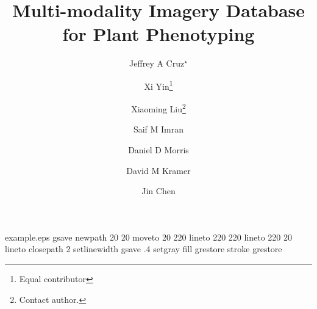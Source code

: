 %
%
%
%
%
\begin{filecontents*}{example.eps}
gsave
newpath
  20 20 moveto
  20 220 lineto
  220 220 lineto
  220 20 lineto
closepath
2 setlinewidth
gsave
  .4 setgray fill
grestore
stroke
grestore
\end{filecontents*}
%
\RequirePackage{fix-cm}
%
\documentclass[smallextended]{svjour3}       %
%
\smartqed  %
%
\usepackage{graphicx}
\usepackage{epstopdf}
\usepackage{color}
\usepackage{multirow}
\usepackage{tabularx}
%
%
%
%
%



\title{Multi-modality Imagery Database for Plant Phenotyping %
}


\author{Jeffrey A Cruz$^\star$ \and Xi Yin\footnote{Equal contributor}  \and Xiaoming Liu\footnote{Contact author. } \and Saif M Imran \and Daniel D Morris \and David M Kramer    \and Jin Chen}

